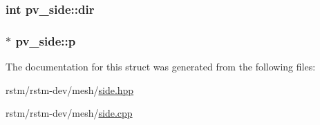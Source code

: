 \hypertarget{structpv__side_ab521366c9cb3938efd02212c05bfbe76}{
\subsubsection[{dir}]{\setlength{\rightskip}{0pt plus 5cm}int pv\-\_\-side\-::dir}}\label{structpv__side_ab521366c9cb3938efd02212c05bfbe76}
\hypertarget{structpv__side_a3928abff0a5599798efc9fe8c33e0cfb}{
\subsubsection[{p}]{$\ast$ pv\-\_\-side\-::p}}\label{structpv__side_a3928abff0a5599798efc9fe8c33e0cfb}


The documentation for this struct was generated from the following files\-:\begin{DoxyCompactItemize}
\item 
rstm/rstm-\/dev/mesh/\hyperlink{side_8hpp}{side.\-hpp}\item 
rstm/rstm-\/dev/mesh/\hyperlink{side_8cpp}{side.\-cpp}\end{DoxyCompactItemize}
